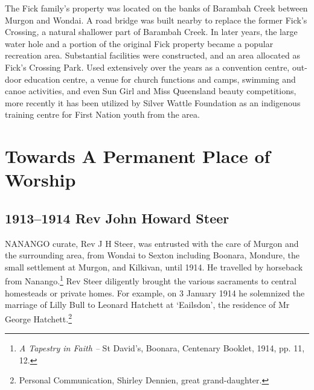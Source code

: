 The Fick family's property was located on the banks of Barambah Creek between Murgon and Wondai. A road bridge was built nearby to replace the former Fick's Crossing\emph{,} a natural shallower part of Barambah Creek. In later years, the large water hole and a portion of the original Fick property became a popular recreation area. Substantial facilities were constructed, and an area allocated as Fick's Crossing Park\emph{.} Used extensively over the years as a convention centre, out-door education centre, a venue for church functions and camps, swimming and canoe activities, and even Sun Girl and Miss Queensland beauty competitions, more recently it has been utilized by Silver Wattle Foundation as an indigenous training centre for First Nation youth from the area.



\balance


\printendnotes[custom]
\setcounter{endnote}{0}
\chapter{Towards A Permanent Place of Worship}
\nobalance


\section{1913--1914 Rev John Howard Steer}



\lettrine[lines=3]{N}{ANANGO}
 curate, Rev J H Steer, was entrusted with the care of Murgon and the surrounding area, from Wondai to Sexton including Boonara, Mondure, the small settlement at Murgon, and Kilkivan, until 1914. He travelled by horseback from Nanango.\footnote{\emph{A Tapestry in Faith --} St David's, Boonara, Centenary Booklet, 1914, pp. 11, 12.} Rev Steer diligently brought the various sacraments to central homesteads or private homes. For example, on 3 January 1914 he solemnized the marriage of Lilly Bull to Leonard Hatchett at `Eailsdon', the residence of Mr George Hatchett.\footnote{Personal Communication, Shirley Dennien, great grand-daughter.}








